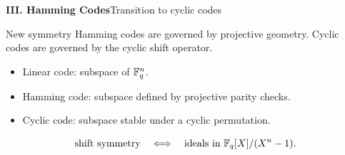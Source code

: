\begin{frame}{\textbf{III. Hamming Codes}}{Transition to cyclic codes}
\small
\begin{block}{New symmetry}
Hamming codes are governed by projective geometry. Cyclic codes are governed by the cyclic shift operator.
\end{block}
\begin{itemize}
  \item Linear code: subspace of $\mathbb{F}_q^n$.
  \item Hamming code: subspace defined by projective parity checks.
  \item Cyclic code: subspace stable under a cyclic permutation.
\end{itemize}
\[
  \text{shift symmetry}\quad\Longleftrightarrow\quad\text{ideals in }\mathbb{F}_q[X]/(X^n-1).
\]
\end{frame}

